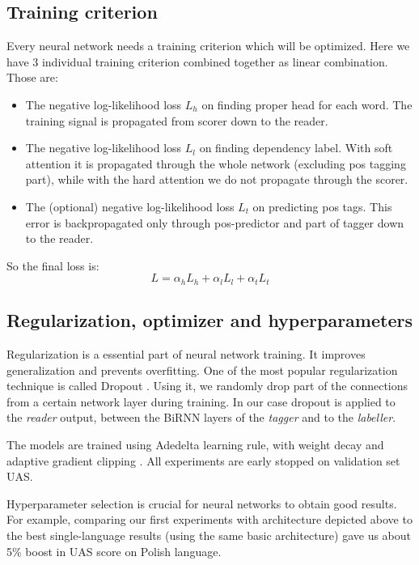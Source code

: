 \subsection{Training criterion}
Every neural network needs a training criterion which will be optimized.
Here we have 3 individual training criterion combined together as linear
combination. Those are:
\begin{itemize}
        \item The negative log-likelihood loss $L_h$ on finding proper head for each
            word. The training signal is propagated from scorer down to the reader.
        \item The negative log-likelihood loss $L_l$ on finding dependency label.
            With soft attention it is propagated through the whole network (excluding
            pos tagging part), while with the hard attention we do not propagate
            through the scorer.
        \item The (optional) negative log-likelihood loss $L_t$ on predicting pos tags.
            This error is backpropagated only through pos-predictor and part of tagger
            down to the reader.
\end{itemize}
So the final loss is:
\begin{equation}\label{eq:neural_loss}
    L = \alpha_hL_h + \alpha_lL_l + \alpha_tL_t
\end{equation}

\subsection{Regularization, optimizer and hyperparameters}
Regularization is a essential part of  neural network training. It improves 
generalization and prevents overfitting. One of the most popular regularization
technique is called Dropout \cite{srivastava_dropout:_2014}. Using it, we randomly
drop part of the connections from a certain network layer during training.
In our case dropout is applied to the \emph{reader} output, between the BiRNN
layers of the \emph{tagger} and to the \emph{labeller}.

The models are trained using Adedelta\cite{zeiler_adadelta:_2012} learning rule,
with weight decay and adaptive gradient clipping \cite{chorowski_end--end_2014}.
All experiments are early stopped on validation set UAS.

Hyperparameter selection is crucial for neural networks to obtain good results.
For example, comparing our first experiments with architecture depicted above to
the best single-language results (using the same basic architecture) gave us
about 5\% boost in UAS score on Polish language.

